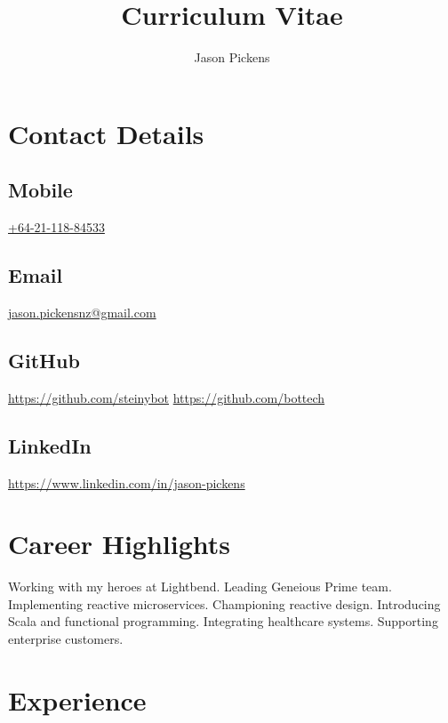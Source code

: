 \documentclass[11pt]{article}
\title{Curriculum Vitae}
\author{Jason Pickens}
\begin{document}
    \maketitle


    \section{Contact Details}
    \label{sec:contact-details}

    \subsection{Mobile}
    \label{subsec:mobile}
    \faMobile \href{tel:+64-21-118-84533}{+64-21-118-84533}

    \subsection{Email}
    \label{subsec:email}
    \faEnvelopeO \href{mailto:jason.pickensnz@gmail.com}{jason.pickensnz@gmail.com}

    \subsection{GitHub}
    \label{subsec:github}
    \faGithub \href{https://github.com/steinybot}{https://github.com/steinybot}
    \faGithub \href{https://github.com/bottech}{https://github.com/bottech}

    \subsection{LinkedIn}
    \label{subsec:linkedin}
    \faLinkedin \href{https://www.linkedin.com/in/jason-pickens}{https://www.linkedin.com/in/jason-pickens}


    \section{Career Highlights}
    \label{sec:career-highlights}
    Working with my heroes at Lightbend.
    Leading Geneious Prime team.
    Implementing reactive microservices.
    Championing reactive design.
    Introducing Scala and functional programming.
    Integrating healthcare systems.
    Supporting enterprise customers.


    \section{Experience}
    \label{sec:experience}
\end{document}
